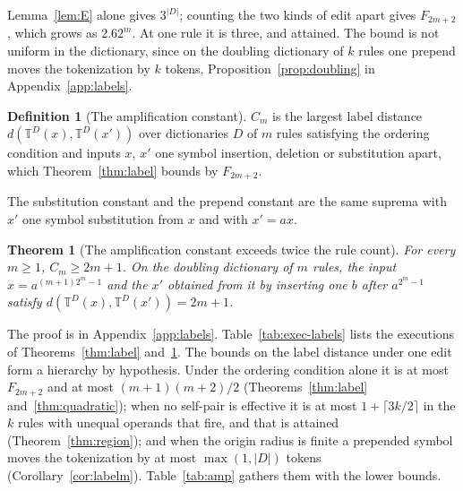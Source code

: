 \documentclass[11pt,a4paper]{article}
\theoremstyle{definition}
\newtheorem{definition}{Definition}
\theoremstyle{plain}
\newtheorem{theorem}{Theorem}
\newcommand{\T}{\mathbb{T}}
\begin{document}
Lemma~\ref{lem:E} alone gives \(3^{|D|}\); counting the two kinds of edit apart gives \(F_{2m+2}\), which grows as
\(2.62^m\). At one rule it is three, and attained. The bound is not uniform in the dictionary, since on the doubling
dictionary of \(k\) rules one prepend moves the tokenization by \(k\) tokens, Proposition~\ref{prop:doubling} in
Appendix~\ref{app:labels}.


\begin{definition}[The amplification constant]\label{def:amp}
\(C_m\) is the largest label distance \(d(\T^D(x), \T^D(x'))\) over dictionaries \(D\) of \(m\) rules satisfying the
ordering condition and inputs \(x\), \(x'\) one symbol insertion, deletion or substitution apart, which
Theorem~\ref{thm:label} bounds by \(F_{2m+2}\).
\end{definition}

The substitution constant and the prepend constant are the same suprema with \(x'\) one symbol substitution from \(x\)
and with \(x' = ax\).

\begin{theorem}[The amplification constant exceeds twice the rule count]\label{thm:amp}
For every \(m \ge 1\), \(C_m \ge 2m + 1\). On the doubling dictionary of \(m\) rules, the input \(x = a^{(m+1)2^m - 1}\)
and the \(x'\) obtained from it by inserting one \(b\) after \(a^{2^m - 1}\) satisfy \(d(\T^D(x), \T^D(x')) = 2m + 1\).
\end{theorem}

The proof is in Appendix~\ref{app:labels}. Table~\ref{tab:exec-labels} lists the executions of Theorems~\ref{thm:label}
and~\ref{thm:amp}. The bounds on the label distance under one edit form a hierarchy by hypothesis. Under the ordering
condition alone it is at most \(F_{2m+2}\) and at most \((m + 1)(m + 2)/2\) (Theorems~\ref{thm:label}
and~\ref{thm:quadratic}); when no self-pair is effective it is at most \(1 + \lceil 3k/2 \rceil\) in the \(k\) rules
with unequal operands that fire, and that is attained (Theorem~\ref{thm:region}); and when the origin radius is finite a
prepended symbol moves the tokenization by at most \(\max(1, |D|)\) tokens (Corollary~\ref{cor:labelm}).
Table~\ref{tab:amp} gathers them with the lower bounds.
\end{document}
